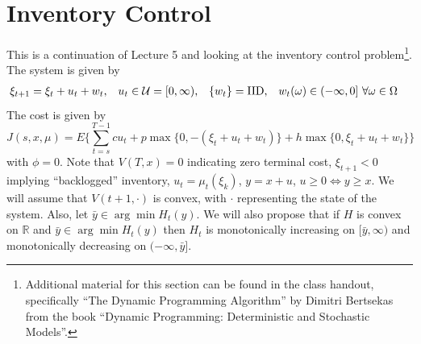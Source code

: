 
\mainmatter
\setcounter{page}{1}

\lectureseries[\course]{\course}

\date{October 15, 2009}

\setaddress

\setcounter{lecture}{5}
\setcounter{chapter}{5}


\section{Inventory Control}
This is a continuation of Lecture 5 and looking at the inventory control problem\footnote{Additional material for this section can be found in the class handout, specifically ``The Dynamic Programming Algorithm'' by Dimitri Bertsekas from the book ``Dynamic Programming: Deterministic and Stochastic Models''.}. The system is given by
\begin{align*}
\begin{split}
\xi_{t+1} &= \xi_t+u_t+w_t,
\end{split}
\begin{split}
u_t\in\mathcal{U}&=[0,\infty),
\end{split}
\begin{split}
\{w_t\} &= \text{IID},
\end{split}
\begin{split}
w_t(\omega) &\in (-\infty,0] ~\forall \omega\in\Omega
\end{split}
\end{align*}
The cost is given by
$$J(s,x,\mu) = E\{\sum_{t=s}^{T-1} cu_t + p\max\{0,-(\xi_t+u_t+w_t)\} + h\max\{0,\xi_t+u_t+w_t\}\}$$
with $\phi=0$. Note that $V(T,x)=0$ indicating zero terminal cost, $\xi_{t+1}<0$ implying ``backlogged'' inventory, $u_t=\mu_t(\xi_k)$, $y=x+u$, $u\geq 0\Leftrightarrow y\geq x$. We will assume that $V(t+1,\cdot)$ is convex, with $\cdot$ representing the state of the system. Also, let $\bar{y}\in\arg\min H_t(y)$. We will also propose that if $H$ is convex on $\mathbb{R}$ and $\bar{y}\in\arg\min H_t(y)$ then $H_t$ is monotonically increasing on $[\bar{y},\infty)$ and monotonically decreasing on $(-\infty,\bar{y}]$.

